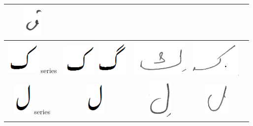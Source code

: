 \begin{table}[h]
\begin{tabular}{@{}ccccc@{}}
\includegraphics[scale=0.20]{25} & \\ 
\hline
\includegraphics[scale=0.20]{Kaaf_orig} series & \includegraphics[scale=0.20]{Kaaf_orig} \includegraphics[scale=0.20]{Gaaf_orig} &\includegraphics[scale=0.20]{26} &
\includegraphics[scale=0.20]{27} & \\ 
\hline
\includegraphics[scale=0.20]{laam_orig} series & \includegraphics[scale=0.25]{laam_orig} & \includegraphics[scale=0.25]{laam2} &
\includegraphics[scale=0.20]{28} & \\ 

\end{tabular}
\end{table}
